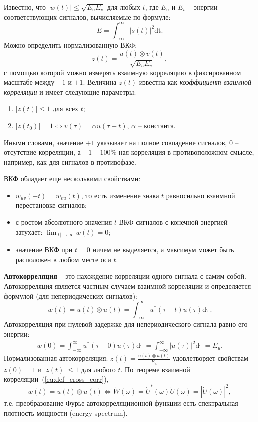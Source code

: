\documentclass[12pt,a4paper]{article}
\begin{document}
Известно, что $|w(t)|\leq\sqrt{E_uE_v}$ для любых $t$, где $E_u$ и $E_v$ -- энергии соответствующих сигналов, вычисляемые по формуле:
\begin{equation}
\nonumber
  E=\int_{-\infty}^{\infty}{|s(t)|}^2\mathrm{dt}.
\end{equation}
Можно определить нормализованную ВКФ:
\begin{equation}
\nonumber
  z(t)=\frac{u(t)\otimes v(t)}{\sqrt{E_uE_v}},
\end{equation}
с помощью которой можно измерять взаимную корреляцию в фиксированном масштабе между $-1$ и $+1$. Величина $z(t)$ известна как \emph{коэффициент взаимной корреляции} и имеет следующие параметры:
\begin{enumerate}
\item $|z(t)|\leq 1$ для всех $t$;
\item $|z(t_0)|=1\Leftrightarrow v(\tau)=\alpha u(\tau -t)$, $\alpha$ -- константа.
\end{enumerate}
Иными словами, значение $+1$ указывает на полное совпадение сигналов, $0$ -- отсутствие корреляции, а $-1$ -- $100\%$-ная корреляция в противоположном смысле, например, как для сигналов в противофазе.

ВКФ обладает еще несколькими свойствами:
\begin{itemize}
\item $w_{uv}(-t)=w_{vu}(t)$, то есть изменение знака $t$ равносильно взаимной перестановке сигналов;
\item с ростом абсолютного значения $t$ ВКФ сигналов с конечной энергией затухает: $\lim_{|t|\rightarrow\infty}w(t)=0$;
\item значение ВКФ при $t=0$ ничем не выделяется, а максимум может быть расположен в любом месте оси $t$.
\end{itemize}

\textbf{Автокорреляция} -- это нахождение корреляции одного сигнала с самим собой. Автокорреляция является частным случаем взаимной корреляции и определяется формулой (для непериодических сигналов):
\begin{equation}
\nonumber
w(t)=u(t)\otimes u(t)=\int_{-\infty}^{\infty}{u^*(\tau\pm t)u(\tau)\mathrm{d\tau}}.
\end{equation}
Автокорреляция при нулевой задержке для непериодического сигнала равно его энергии:
\begin{align}
\nonumber
  w(0)=\int_{-\infty}^{\infty}{u^*(\tau-0)u(\tau)\mathrm{d\tau}}=\int_{-\infty}^{\infty}{|u(\tau)|^2\mathrm{d\tau}}=E_u.
\end{align}
Нормализованная автокорреляция: $z(t)=\frac{u(t)\otimes u(t)}{E_u}$ удовлетворяет свойствам $z(0)=1$ и $|z(t)|\leq 1$ для любого $t$.
По теореме взаимной корреляции~(\ref{eq:def_cross_corr}),
\begin{equation}
\nonumber
  w(t)=u(t)\otimes u(t) \Leftrightarrow \dot{W}(\omega)=\dot{U}^*(\omega)\dot{U}(\omega)=|\dot{U}(\omega)|^2,
\end{equation}
т.е. преобразование Фурье автокорреляциионной функции есть спект\-ральная плотность мощности (energy spectrum).
\end{document}
